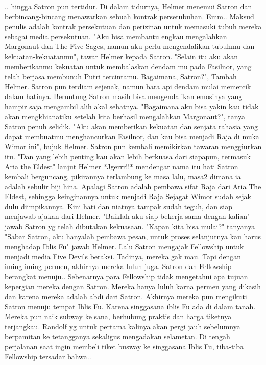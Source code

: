 \documentclass[a4paper,11pt,final]{article}
\begin{document}
.. hingga Satron pun tertidur. Di dalam tidurnya, Helmer menemui Satron dan berbincang-bincang menawarkan sebuah kontrak persetubuhan. Emm.. Maksud penulis adalah kontrak persekutuan dan perizinan untuk memasuki tubuh mereka sebagai media persekutuan.
"Aku bisa membantu engkau mengalahkan Margonaut dan The Five Sages, namun aku perlu mengendalikan tubuhmu dan kekuatan-kekuatanmu", tawar Helmer kepada Satron.
"Selain itu aku akan memberikanmu kekuatan untuk membalaskan dendam mu pada Fasilnor, yang telah berjasa membunuh Putri tercintamu. Bagaimana, Satron?", Tambah Helmer. Satron pun terdiam sejenak, namun bara api dendam mulai memercik dalam hatinya.
Beruntung Satron masih bisa mengendalikan emosinya yang hampir saja mengambil alih akal sehatnya. "Bagaimana aku bisa yakin kau tidak akan mengkhianatiku setelah kita berhasil mengalahkan Margonaut?", tanya Satron penuh selidik.
"Aku akan memberikan kekuatan dan senjata rahasia yang dapat membuatmu menghancurkan Fasilnor, dan kau bisa menjadi Raja di muka Wimor ini", bujuk Helmer. Satron pun kembali memikirkan tawaran menggiurkan itu.
"Dan yang lebih penting kau akan lebih berkuasa dari siapapun, termasuk Aria the Eldest" lanjut Helmer *Jgerrr!!* mendengar nama itu hati Satron kembali berguncang, pikirannya terlambung ke masa lalu, masa2 dimana ia adalah sebulir biji hina.
Apalagi Satron adalah pembawa sifat Raja dari Aria The Eldest, sehingga keinginannya untuk menjadi Raja Sejagat Wimor sudah sejak dulu diimpikannya. Kini hati dan niatnya tampak sudah teguh, dan siap menjawab ajakan dari Helmer.
"Baiklah aku siap bekerja sama dengan kalian" jawab Satron yg telah dibutakan kekuasaan. "Kapan kita bisa mulai?" tanyanya "Sabar Satron, aku hanyalah pembawa pesan, untuk proses selanjutnya kau harus menghadap Iblis Fu" jawab Helmer.
Lalu Satron mengajak Fellowship untuk menjadi media Five Devils beraksi. Tadinya, mereka gak mau. Tapi dengan iming-iming permen, akhirnya mereka luluh juga. Satron dan Fellowship berangkat menuju..
Sebenarnya para Fellowship tidak mengetahui apa tujuan kepergian mereka dengan Satron. Mereka hanya luluh karna permen yang dikasih dan karena mereka adalah abdi dari Satron. Akhirnya mereka pun mengikuti Satron menuju tempat Iblis Fu.
Karena singgasana iblis Fu ada di dalam tanah. Mereka pun naik subway ke sana, berhubung praktis dan harga tiketnya terjangkau. Randolf yg untuk pertama kalinya akan pergi jauh sebelumnya berpamitan ke tetangganya sekaligus mengadakan selametan.
Di tengah perjalanan saat ingin membeli tiket busway ke singgasana Iblis Fu, tiba-tiba Fellowship tersadar bahwa..
\end{document}
